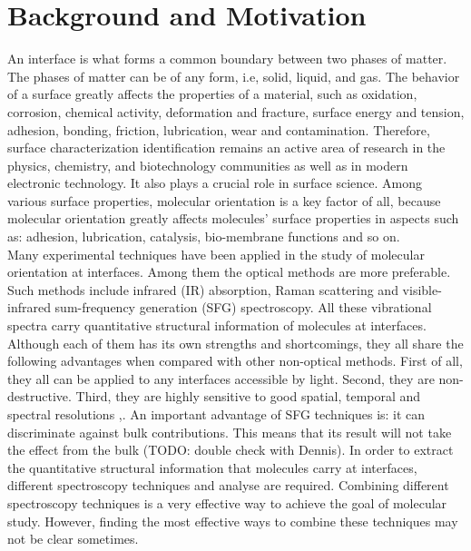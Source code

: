  \label{ch:1}
\section{Background and Motivation}
An interface is what forms a common boundary between two phases of matter. The phases of matter can be of any form, i.e, solid, liquid, and gas. The behavior of a surface greatly affects the properties of a material, such as oxidation, corrosion, chemical activity, deformation and fracture, surface energy and tension, adhesion, bonding, friction, lubrication, wear and contamination. Therefore, surface characterization identification remains an active area of research in the physics, chemistry, and biotechnology communities as well as in modern electronic technology. It also plays a crucial role in surface science. Among various surface properties, molecular orientation is a key factor of all, because molecular orientation greatly affects molecules' surface properties in aspects such as: adhesion, lubrication, catalysis, bio-membrane functions and so on. \cite{PhysRevB.59.12632}\\

Many experimental techniques have been applied in the study of molecular orientation at interfaces. Among them the optical methods are more preferable. Such methods include infrared (IR) absorption, Raman scattering and visible-infrared sum-frequency generation (SFG) spectroscopy. All these vibrational spectra carry quantitative structural information of molecules at interfaces. Although each of them has its own strengths and shortcomings, they all share the following advantages when compared with other non-optical methods. First of all, they all can be applied to any interfaces accessible by light. Second, they are non-destructive. Third, they are highly sensitive to good spatial, temporal and spectral resolutions \cite{Brasselet:11},\cite{PhysRevB.59.12632}. An important advantage of SFG techniques is: it can discriminate against bulk contributions. This means that its result will not take the effect from the bulk (TODO: double check with Dennis). In order to extract the quantitative structural information that molecules carry at interfaces, different spectroscopy techniques and analyse are required. Combining different spectroscopy techniques is a very effective way to achieve the goal of molecular study. However, finding the most effective ways to combine these techniques may not be clear sometimes.\\


